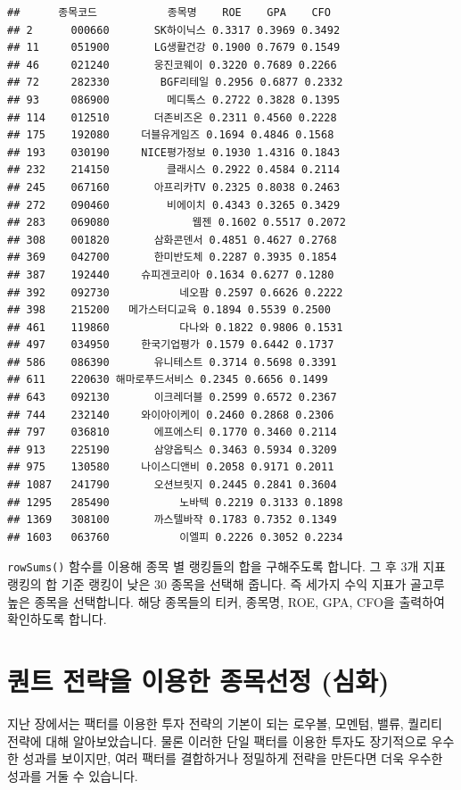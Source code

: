 \documentclass[12pt,]{book}
\begin{document}
\begin{verbatim}
##      종목코드           종목명    ROE    GPA    CFO
## 2      000660       SK하이닉스 0.3317 0.3969 0.3492
## 11     051900       LG생활건강 0.1900 0.7679 0.1549
## 46     021240       웅진코웨이 0.3220 0.7689 0.2266
## 72     282330        BGF리테일 0.2956 0.6877 0.2332
## 93     086900         메디톡스 0.2722 0.3828 0.1395
## 114    012510       더존비즈온 0.2311 0.4560 0.2228
## 175    192080     더블유게임즈 0.1694 0.4846 0.1568
## 193    030190     NICE평가정보 0.1930 1.4316 0.1843
## 232    214150         클래시스 0.2922 0.4584 0.2114
## 245    067160       아프리카TV 0.2325 0.8038 0.2463
## 272    090460         비에이치 0.4343 0.3265 0.3429
## 283    069080             웹젠 0.1602 0.5517 0.2072
## 308    001820       삼화콘덴서 0.4851 0.4627 0.2768
## 369    042700       한미반도체 0.2287 0.3935 0.1854
## 387    192440     슈피겐코리아 0.1634 0.6277 0.1280
## 392    092730           네오팜 0.2597 0.6626 0.2222
## 398    215200   메가스터디교육 0.1894 0.5539 0.2500
## 461    119860           다나와 0.1822 0.9806 0.1531
## 497    034950     한국기업평가 0.1579 0.6442 0.1737
## 586    086390       유니테스트 0.3714 0.5698 0.3391
## 611    220630 해마로푸드서비스 0.2345 0.6656 0.1499
## 643    092130       이크레더블 0.2599 0.6572 0.2367
## 744    232140     와이아이케이 0.2460 0.2868 0.2306
## 797    036810       에프에스티 0.1770 0.3460 0.2114
## 913    225190       삼양옵틱스 0.3463 0.5934 0.3209
## 975    130580     나이스디앤비 0.2058 0.9171 0.2011
## 1087   241790       오션브릿지 0.2445 0.2841 0.3604
## 1295   285490           노바텍 0.2219 0.3133 0.1898
## 1369   308100       까스텔바쟉 0.1783 0.7352 0.1349
## 1603   063760           이엘피 0.2226 0.3052 0.2234
\end{verbatim}

\texttt{rowSums()} 함수를 이용해 종목 별 랭킹들의 합을 구해주도록 합니다. 그 후 3개 지표 랭킹의 합 기준 랭킹이 낮은 30 종목을 선택해 줍니다. 즉 세가지 수익 지표가 골고루 높은 종목을 선택합니다. 해당 종목들의 티커, 종목명, ROE, GPA, CFO을 출력하여 확인하도록 합니다.

\hypertarget{section-59}{%
\chapter{퀀트 전략을 이용한 종목선정 (심화)}\label{section-59}}

지난 장에서는 팩터를 이용한 투자 전략의 기본이 되는 로우볼, 모멘텀, 밸류, 퀄리티 전략에 대해 알아보았습니다. 물론 이러한 단일 팩터를 이용한 투자도 장기적으로 우수한 성과를 보이지만, 여러 팩터를 결합하거나 정밀하게 전략을 만든다면 더욱 우수한 성과를 거둘 수 있습니다.
\end{document}

